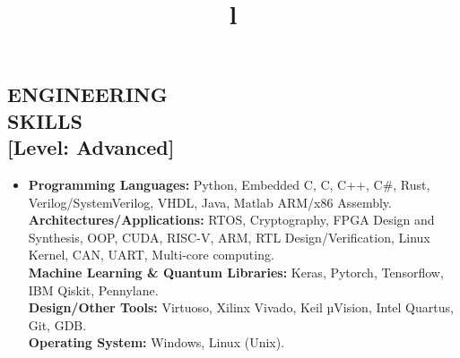 \documentclass[line,margin,9pt]{res}
\begin{document}
\begin{resume}
\section{ENGINEERING\\SKILLS\\\textbf{[Level: Advanced]}}
\begin{itemize}
\item \textbf{Programming Languages:} Python, Embedded C, C, C++, C\#, Rust, Verilog/SystemVerilog, VHDL, Java, Matlab  ARM/x86 Assembly. \\
\textbf{Architectures/Applications:} RTOS, Cryptography, FPGA Design and Synthesis, OOP, CUDA, RISC-V, ARM, RTL Design/Verification, Linux Kernel, CAN, UART, Multi-core computing. \\
\textbf{Machine Learning \& Quantum Libraries:} Keras, Pytorch, Tensorflow, IBM Qiskit, Pennylane.\\
\textbf{Design/Other Tools:} Virtuoso, Xilinx Vivado, Keil µVision, Intel Quartus, Git, GDB. \\
\textbf{Operating System:} Windows, Linux (Unix).
\end{itemize}
\begin{format}
\title{l}\\
\\
\body\\
\end{format}





\end{resume}
\end{document}
